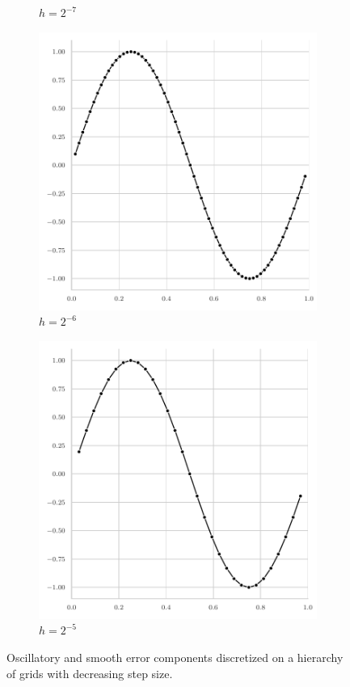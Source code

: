 \begin{figure}
\begin{subfigure}[b]{0.32\textwidth}
		\caption{$h = 2^{-7}$}
	\end{subfigure}
	\hfill
	\begin{subfigure}[b]{0.32\textwidth}
		\centering
		\includegraphics[width=\textwidth]{figures/initial_error_2pi_level6.pdf}
		\caption{$h = 2^{-6}$}
	\end{subfigure}
	\hfill
	\begin{subfigure}[b]{0.32\textwidth}
		\centering
		\includegraphics[width=\textwidth]{figures/initial_error_2pi_level5.pdf}
		\caption{$h = 2^{-5}$}
	\end{subfigure}
	\caption{Oscillatory and smooth error components discretized on a hierarchy of grids with decreasing step size.}
	\label{fig:error-on-multiple-levels}
\end{figure}
